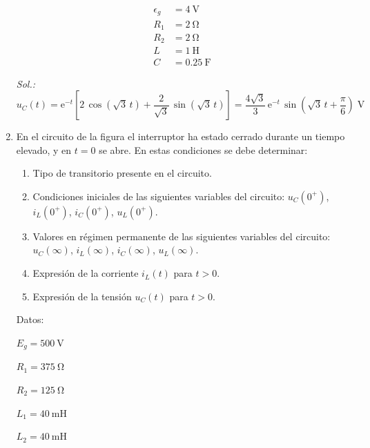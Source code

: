 \begin{enumerate}
\begin{minipage}{0.5\linewidth}
  \begin{align*}
    \epsilon_g &= \SI{4}{\volt}\\
    R_1 &= \SI{2}{\ohm}\\
    R_2 &= \SI{2}{\ohm}\\
    L &= \SI{1}{\henry}\\
    C &= \SI{0.25}{\farad}      
  \end{align*}
  \end{minipage}

  \emph{Sol.:\;
    $u_C(t)=
    \mathrm{e}^{-t}\left[2\,\cos(\sqrt{3}\,t)+\dfrac{2}{\sqrt{3}}\,\sin(\sqrt{3}\,t)\right]=\dfrac{4\sqrt{3}}{3}\,\mathrm{e}^{-t}\,\sin\left(\sqrt{3}\,t+\dfrac{\pi}{6}\right) \;\si{\volt}$
    }

\item En el circuito de la figura el interruptor ha estado cerrado
  durante un tiempo elevado, y en $t = 0$ se abre. En estas
  condiciones se debe determinar:

  \begin{enumerate}
  \item Tipo de transitorio presente en el circuito.

  \item Condiciones iniciales de las siguientes variables del
    circuito: $u_C(0^+)$, $i_L(0^+)$, $i_C(0^+)$, $u_L(0^+)$.
  \item Valores en régimen permanente de las siguientes variables del
    circuito: $u_C(\infty)$, $i_L(\infty)$, $i_C(\infty)$,
    $u_L(\infty)$.
  \item Expresión de la corriente $i_L(t)$ para $t > 0$.
  \item Expresión de la tensión $u_C(t)$ para $t > 0$.
  \end{enumerate}

\begin{minipage}{0.3\linewidth}
  Datos:
    \vspace{2mm}

  $E_g = \SI{500}{\volt}$

  $R_{1}= \SI{375}{\ohm}$%

  $R_{2}=\SI{125}{\ohm}$%

  $L_1 = \SI{40}{\milli\henry}$%

  $L_2 = \SI{40}{\milli\henry}$%


\end{minipage}
\end{enumerate}
